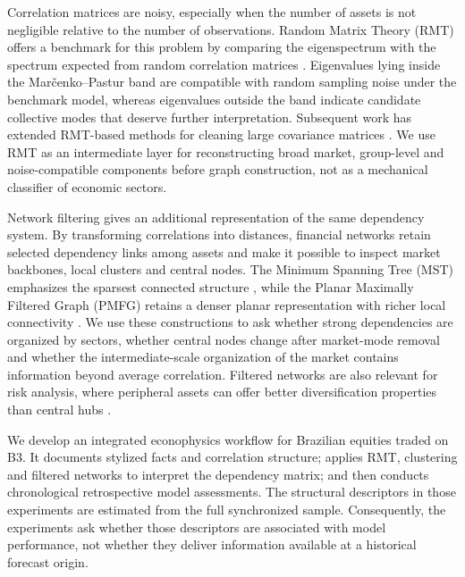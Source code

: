 Correlation matrices are noisy, especially when the number of assets is not negligible relative to the number of observations. Random Matrix Theory (RMT) offers a benchmark for this problem by comparing the eigenspectrum with the spectrum expected from random correlation matrices \cite{marcenko_1967_distribution,laloux_1999_noise,plerou_2002_random}. Eigenvalues lying inside the Mar\v{c}enko--Pastur band are compatible with random sampling noise under the benchmark model, whereas eigenvalues outside the band indicate candidate collective modes that deserve further interpretation. Subsequent work has extended RMT-based methods for cleaning large covariance matrices \cite{bun_2017_cleaning}. We use RMT as an intermediate layer for reconstructing broad market, group-level and noise-compatible components before graph construction, not as a mechanical classifier of economic sectors.

Network filtering gives an additional representation of the same dependency system. By transforming correlations into distances, financial networks retain selected dependency links among assets and make it possible to inspect market backbones, local clusters and central nodes. The Minimum Spanning Tree (MST) emphasizes the sparsest connected structure \cite{mantegna_1999_hierarchical}, while the Planar Maximally Filtered Graph (PMFG) retains a denser planar representation with richer local connectivity \cite{tumminello_2005_tool,tumminello_2010_correlation}. We use these constructions to ask whether strong dependencies are organized by sectors, whether central nodes change after market-mode removal and whether the intermediate-scale organization of the market contains information beyond average correlation. Filtered networks are also relevant for risk analysis, where peripheral assets can offer better diversification properties than central hubs \cite{pozzi_2013_spread,aste_2010_correlation}.

We develop an integrated econophysics workflow for Brazilian equities traded on B3. It documents stylized facts and correlation structure; applies RMT, clustering and filtered networks to interpret the dependency matrix; and then conducts chronological retrospective model assessments. The structural descriptors in those experiments are estimated from the full synchronized sample. Consequently, the experiments ask whether those descriptors are associated with model performance, not whether they deliver information available at a historical forecast origin.

